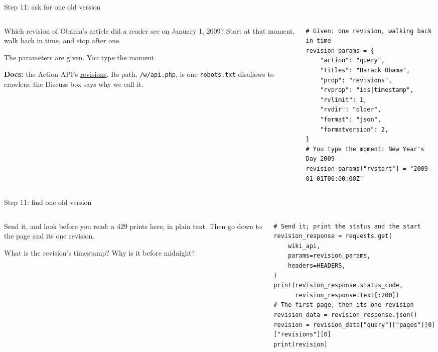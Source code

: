 \documentclass[9pt,aspectratio=169]{beamer}
\begin{document}
\begin{frame}[fragile]{Step 11: ask for one old version}
    \begin{columns}[T]
        \begin{column}{0.37\textwidth}
            Which revision of Obama's article did a reader see on January 1, 2009? Start at that moment, walk back in time, and stop after one.

            \medskip
            The parameters are given. You type the moment.

            \medskip
            {\scriptsize\textbf{Docs:} the Action API's \href{https://www.mediawiki.org/wiki/API:Revisions}{revisions}. Its path, \texttt{/w/api.php}, is one \texttt{robots.txt} disallows to crawlers: the Discuss box says why we call it.\par}
        \end{column}
        \begin{column}{0.6\textwidth}
\begin{lstlisting}
# Given: one revision, walking back in time
revision_params = {
    "action": "query",
    "titles": "Barack Obama",
    "prop": "revisions",
    "rvprop": "ids|timestamp",
    "rvlimit": 1,
    "rvdir": "older",
    "format": "json",
    "formatversion": 2,
}
# You type the moment: New Year's Day 2009
revision_params["rvstart"] = "2009-01-01T00:00:00Z"
\end{lstlisting}
        \end{column}
    \end{columns}
\end{frame}

\begin{frame}[fragile]{Step 11: find one old version}
    \begin{columns}[T]
        \begin{column}{0.37\textwidth}
            Send it, and look before you read: a 429 prints here, in plain text. Then go down to the page and its one revision.

            \medskip
            What is the revision's timestamp? Why is it before midnight?
        \end{column}
        \begin{column}{0.6\textwidth}
\begin{lstlisting}
# Send it; print the status and the start
revision_response = requests.get(
    wiki_api,
    params=revision_params,
    headers=HEADERS,
)
print(revision_response.status_code,
      revision_response.text[:200])
# The first page, then its one revision
revision_data = revision_response.json()
revision = revision_data["query"]["pages"][0]["revisions"][0]
print(revision)
\end{lstlisting}
        \end{column}
    \end{columns}
\end{frame}
\end{document}
